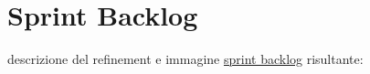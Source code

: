 \section{Sprint Backlog}
descrizione del refinement e immagine \href{https://github.com/orgs/ISIQuiz/projects/3/}{sprint backlog} risultante:

